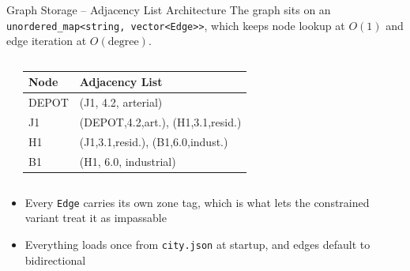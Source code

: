 \documentclass[aspectratio=169,11pt]{beamer}
\begin{document}
\begin{frame}[fragile]{Graph Storage -- Adjacency List Architecture}
\footnotesize
The graph sits on an \texttt{unordered\_map<string, vector<Edge>>}, which keeps node lookup at $O(1)$ and edge iteration at $O(\text{degree})$.
\vspace{1mm}
\begin{columns}[T,totalwidth=\textwidth]
\begin{center}
\end{center}
\renewcommand{\arraystretch}{1.05}
\begin{tabularx}{\textwidth}{@{}>{\ttfamily\tiny}p{1.1cm}X@{}}
\toprule
\normalfont\tiny Node & \tiny Adjacency List\\
\midrule
\tiny DEPOT & \tiny (J1, 4.2, arterial)\\
\tiny J1 & \tiny (DEPOT,4.2,art.), (H1,3.1,resid.)\\
\tiny H1 & \tiny (J1,3.1,resid.), (B1,6.0,indust.)\\
\tiny B1 & \tiny (H1, 6.0, industrial)\\
\bottomrule
\end{tabularx}
\end{columns}
\begin{itemize}\itemsep1pt
\item Every \texttt{Edge} carries its own zone tag, which is what lets the constrained variant treat it as impassable
\item Everything loads once from \texttt{city.json} at startup, and edges default to bidirectional
\end{itemize}
\end{frame}
\end{document}
